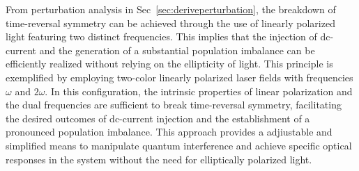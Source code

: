 From perturbation analysis in Sec~\ref{sec:deriveperturbation}, the breakdown of time-reversal symmetry can be achieved through the use of linearly polarized light featuring two distinct frequencies. This implies that the injection of dc-current and the generation of a substantial population imbalance can be efficiently realized without relying on the ellipticity of light. This principle is exemplified by employing two-color linearly polarized laser fields with frequencies $\omega$ and $2\omega$. In this configuration, the intrinsic properties of linear polarization and the dual frequencies are sufficient to break time-reversal symmetry, facilitating the desired outcomes of dc-current injection and the establishment of a pronounced population imbalance. This approach provides a adjiustable and simplified means to manipulate quantum interference and achieve specific optical responses in the system without the need for elliptically polarized light.\\

